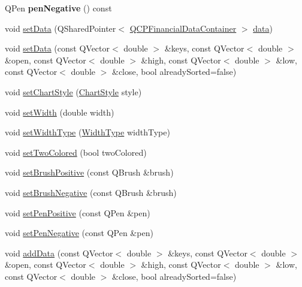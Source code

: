 \begin{DoxyCompactItemize}
\mbox{\label{class_q_c_p_financial_a25d9a8f256e5ddcba56b6e2e7e968653}} 
Q\+Pen {\bfseries pen\+Negative} () const
\item 
void \mbox{\hyperlink{class_q_c_p_financial_a72089e75b8a50d18097526c3c79fdb85}{set\+Data}} (Q\+Shared\+Pointer$<$ \mbox{\hyperlink{class_q_c_p_data_container}{Q\+C\+P\+Financial\+Data\+Container}} $>$ \mbox{\hyperlink{class_q_c_p_financial_aec3f666271cf48bd7b87d84fe3f8c074}{data}})
\item 
void \mbox{\hyperlink{class_q_c_p_financial_a12992e669ed19d7bb48dbe601570cc05}{set\+Data}} (const Q\+Vector$<$ double $>$ \&keys, const Q\+Vector$<$ double $>$ \&open, const Q\+Vector$<$ double $>$ \&high, const Q\+Vector$<$ double $>$ \&low, const Q\+Vector$<$ double $>$ \&close, bool already\+Sorted=false)
\item 
void \mbox{\hyperlink{class_q_c_p_financial_a5a59175d36279d71596e64d7bb65596f}{set\+Chart\+Style}} (\mbox{\hyperlink{class_q_c_p_financial_a0f800e21ee98d646dfc6f8f89d10ebfb}{Chart\+Style}} style)
\item 
void \mbox{\hyperlink{class_q_c_p_financial_a99633f8bac86a61d534ae5eeb1a3068f}{set\+Width}} (double width)
\item 
void \mbox{\hyperlink{class_q_c_p_financial_a204b7b710352796593a432b723e34089}{set\+Width\+Type}} (\mbox{\hyperlink{class_q_c_p_financial_aef1761dda71a53dc5269685e9e492626}{Width\+Type}} width\+Type)
\item 
void \mbox{\hyperlink{class_q_c_p_financial_a138e44aac160a17a9676652e240c5f08}{set\+Two\+Colored}} (bool two\+Colored)
\item 
void \mbox{\hyperlink{class_q_c_p_financial_a5ebff2b1764efd07cc44942e67821829}{set\+Brush\+Positive}} (const Q\+Brush \&brush)
\item 
void \mbox{\hyperlink{class_q_c_p_financial_a8bbdd87629f9144b3ef51af660c0961a}{set\+Brush\+Negative}} (const Q\+Brush \&brush)
\item 
void \mbox{\hyperlink{class_q_c_p_financial_ac58aa3adc7a35aab0088764b840683e5}{set\+Pen\+Positive}} (const Q\+Pen \&pen)
\item 
void \mbox{\hyperlink{class_q_c_p_financial_afe5c07e94ccea01a75b3a2476993c346}{set\+Pen\+Negative}} (const Q\+Pen \&pen)
\item 
void \mbox{\hyperlink{class_q_c_p_financial_a372ac031e44a7a6c912d203556af96f7}{add\+Data}} (const Q\+Vector$<$ double $>$ \&keys, const Q\+Vector$<$ double $>$ \&open, const Q\+Vector$<$ double $>$ \&high, const Q\+Vector$<$ double $>$ \&low, const Q\+Vector$<$ double $>$ \&close, bool already\+Sorted=false)

\end{DoxyCompactItemize}
